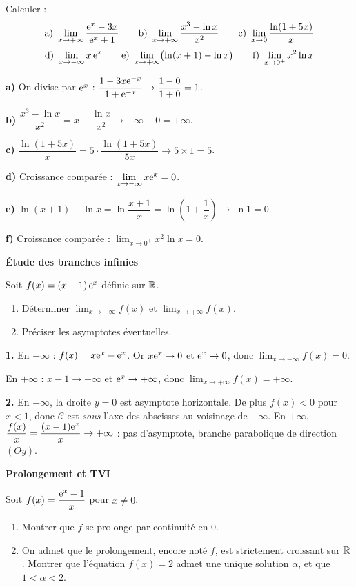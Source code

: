 Calculer :
\[
\text{a) }\lim_{x\to+\infty}\frac{\mathrm{e}^x-3x}{\mathrm{e}^x+1}
\qquad
\text{b) }\lim_{x\to+\infty}\frac{x^3-\ln x}{x^2}
\qquad
\text{c) }\lim_{x\to 0}\frac{\ln(1+5x)}{x}
\]
\[
\text{d) }\lim_{x\to-\infty}x\,\mathrm{e}^{x}
\qquad
\text{e) }\lim_{x\to+\infty}\bigl(\ln(x+1)-\ln x\bigr)
\qquad
\text{f) }\lim_{x\to 0^+}x^2\ln x
\]

\solution

\textbf{a)} On divise par $\mathrm{e}^x$ :
$\dfrac{1-3x\mathrm{e}^{-x}}{1+\mathrm{e}^{-x}}\to\dfrac{1-0}{1+0}=1$.

\textbf{b)} $\dfrac{x^3-\ln x}{x^2}=x-\dfrac{\ln x}{x^2}\to+\infty-0=+\infty$.

\textbf{c)} $\dfrac{\ln(1+5x)}{x}=5\cdot\dfrac{\ln(1+5x)}{5x}\to 5\times 1=5$.

\textbf{d)} Croissance comparée : $\displaystyle\lim_{x\to-\infty}x\mathrm{e}^x=0$.

\textbf{e)} $\ln(x+1)-\ln x=\ln\!\dfrac{x+1}{x}=\ln\!\left(1+\dfrac{1}{x}\right)\to\ln 1=0$.

\textbf{f)} Croissance comparée : $\displaystyle\lim_{x\to 0^+}x^2\ln x=0$.

\bigskip
\exerciceresolu
\textbf{Étude des branches infinies}

Soit $f(x)=(x-1)\,\mathrm{e}^{x}$ définie sur $\mathbb{R}$.
\begin{enumerate}
	\item Déterminer $\displaystyle\lim_{x\to-\infty}f(x)$ et
	$\displaystyle\lim_{x\to+\infty}f(x)$.
	\item Préciser les asymptotes éventuelles.
\end{enumerate}

\solution

\textbf{1.} En $-\infty$ : $f(x)=x\mathrm{e}^x-\mathrm{e}^x$. Or $x\mathrm{e}^x\to 0$ et $\mathrm{e}^x\to 0$,
donc $\displaystyle\lim_{x\to-\infty}f(x)=0$.

En $+\infty$ : $x-1\to+\infty$ et $\mathrm{e}^x\to+\infty$, donc
$\displaystyle\lim_{x\to+\infty}f(x)=+\infty$.

\textbf{2.} En $-\infty$, la droite $y=0$ est asymptote horizontale.
De plus $f(x)<0$ pour $x<1$, donc $\mathcal C$ est \emph{sous} l'axe des
abscisses au voisinage de $-\infty$.
En $+\infty$, $\dfrac{f(x)}{x}=\dfrac{(x-1)\mathrm{e}^x}{x}\to+\infty$ :
pas d'asymptote, branche parabolique de direction $(Oy)$.

\bigskip
\exerciceresolu
\textbf{Prolongement et TVI}

Soit $f(x)=\dfrac{\mathrm{e}^x-1}{x}$ pour $x\neq 0$.
\begin{enumerate}
	\item Montrer que $f$ se prolonge par continuité en $0$.
	\item On admet que le prolongement, encore noté $f$, est strictement
	croissant sur $\mathbb{R}$. Montrer que l'équation $f(x)=2$ admet une unique
	solution $\alpha$, et que $1<\alpha<2$.
\end{enumerate}

